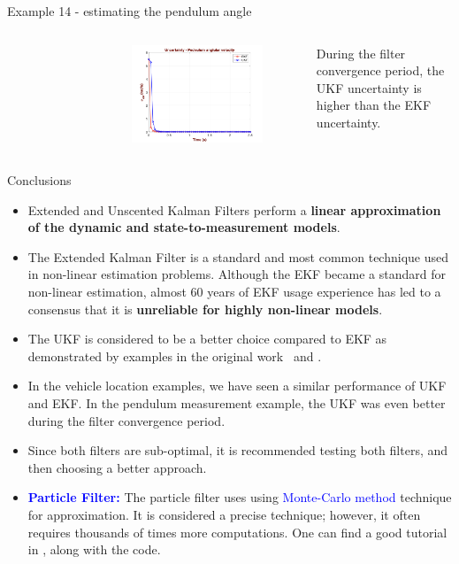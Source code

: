 \begin{frame}{Example 14 - estimating the pendulum angle}
\begin{columns}
\begin{figure}
        \end{figure}
        \vspace{-10pt}
        \begin{figure}
            \centering
            \includegraphics[width=0.6\linewidth]{Figures//Part3/EKFvsUKF_Uncertainty_PendulumAVelocity.png}
        \end{figure}
        During the filter convergence period, the UKF uncertainty is higher than the EKF uncertainty.
\end{columns}    
\end{frame}


\begin{frame}{Conclusions}
\begin{itemize}
    \item Extended and Unscented Kalman Filters perform a \textbf{linear approximation of the
dynamic and state-to-measurement models}.

\item The Extended Kalman Filter is a standard and most common technique used in
non-linear estimation problems. Although the EKF became a standard for non-linear
estimation, almost 60 years of EKF usage experience has led to a consensus that it is
\textbf{unreliable for highly non-linear models}.

    \item The UKF is considered to be a better choice compared to EKF as demonstrated by examples in the original work~\cite{julier1997new} and \cite{van2004sigma}.
\item In the vehicle location examples, we have seen a similar performance of UKF and EKF. In the pendulum measurement example, the UKF was
even better during the filter convergence period.

\item Since both filters are sub-optimal, it is  recommended testing both filters, and then choosing a better approach.

\item \textcolor{blue}{\textbf{Particle Filter:}} The particle filter uses
using \textcolor{blue}{Monte-Carlo method} technique for approximation. It is considered a precise
technique; however, it often requires thousands of times more computations. One can find a good tutorial in \cite{elfring2021particle}, along with the code.
\end{itemize}
\end{frame}


